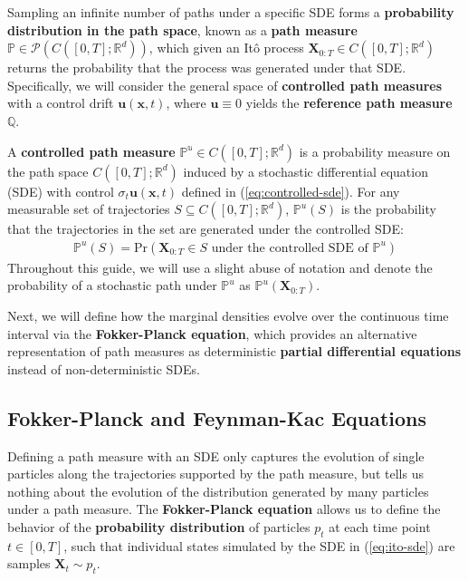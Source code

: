\documentclass{article}
\newcommand{\boldtext}[1]{\textbf{\textcolor{MyGreen}{#1}}}
\begin{document}
Sampling an infinite number of paths under a specific SDE forms a \textbf{probability distribution in the path space}, known as a \boldtext{path measure} $\mathbb{P}\in \mathcal{P}(C([0,T]; \mathbb{R}^d))$, which given an Itô process $\boldsymbol{X}_{0:T}\in C([0,T]; \mathbb{R}^d)$ returns the probability that the process was generated under that SDE. Specifically, we will consider the general space of \boldtext{controlled path measures} with a control drift $\boldsymbol{u}(\boldsymbol{x},t)$, where $\boldsymbol{u}\equiv0$ yields the \boldtext{reference path measure} $\mathbb{Q}$.

\begin{definition}\label{def:path-measure}
A \textbf{controlled path measure} $\mathbb{P^u}\in C([0,T]; \mathbb{R}^d)$ is a probability measure on the path space $C([0,T]; \mathbb{R}^d)$ induced by a stochastic differential equation (SDE) with control $\sigma_t\boldsymbol{u}(\boldsymbol{x},t)$ defined in (\ref{eq:controlled-sde}). For any measurable set of trajectories $S\subseteq C([0,T]; \mathbb{R}^d)$, $\mathbb{P}^u(S)$ is the probability that the trajectories in the set are generated under the controlled SDE:
\begin{align}
    \mathbb{P}^u(S)=\text{Pr}\left(\boldsymbol{X}_{0:T}\in S\text{ under the controlled SDE of }\mathbb{P}^u\right) 
\end{align}
Throughout this guide, we will use a slight abuse of notation and denote the probability of a stochastic path under $\mathbb{P}^u$ as $\mathbb{P}^u(\boldsymbol{X}_{0:T})$. 
\end{definition}

Next, we will define how the marginal densities evolve over the continuous time interval via the \textbf{Fokker-Planck equation}, which provides an alternative representation of path measures as deterministic \textbf{partial differential equations} instead of non-deterministic SDEs.


\subsection{Fokker-Planck and Feynman-Kac Equations}
\label{subsec:fp-equation}
Defining a path measure with an SDE only captures the evolution of single particles along the trajectories supported by the path measure, but tells us nothing about the evolution of the distribution generated by many particles under a path measure. The \boldtext{Fokker-Planck equation} allows us to define the behavior of the \textbf{probability distribution} of particles $p_t$ at each time point $t\in [0,T]$, such that individual states simulated by the SDE in (\ref{eq:ito-sde}) are samples $\boldsymbol{X}_t\sim p_t$.
\end{document}
